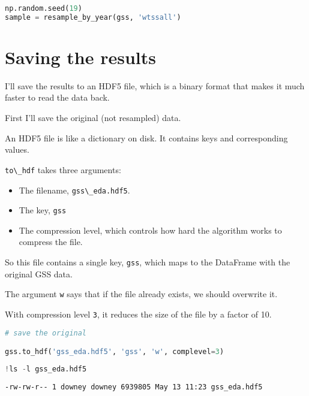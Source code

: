 \begin{lstlisting}[language=Python,style=source]
np.random.seed(19)
sample = resample_by_year(gss, 'wtssall')
\end{lstlisting}

\hypertarget{saving-the-results}{%
\section{Saving the results}\label{saving-the-results}}

I'll save the results to an HDF5 file, which is a binary format that
makes it much faster to read the data back.

First I'll save the original (not resampled) data.

An HDF5 file is like a dictionary on disk. It contains keys and
corresponding values.

\passthrough{\lstinline!to\_hdf!} takes three arguments:

\begin{itemize}
\item
  The filename, \passthrough{\lstinline!gss\_eda.hdf5!}.
\item
  The key, \passthrough{\lstinline!gss!}
\item
  The compression level, which controls how hard the algorithm works to
  compress the file.
\end{itemize}

So this file contains a single key, \passthrough{\lstinline!gss!}, which
maps to the DataFrame with the original GSS data.

The argument \passthrough{\lstinline!w!} says that if the file already
exists, we should overwrite it.

With compression level \passthrough{\lstinline!3!}, it reduces the size
of the file by a factor of 10.

\begin{lstlisting}[language=Python,style=source]
# save the original

gss.to_hdf('gss_eda.hdf5', 'gss', 'w', complevel=3)
\end{lstlisting}

\begin{lstlisting}[language=Python,style=source]
!ls -l gss_eda.hdf5
\end{lstlisting}

\begin{lstlisting}[style=output]
-rw-rw-r-- 1 downey downey 6939805 May 13 11:23 gss_eda.hdf5
\end{lstlisting}

